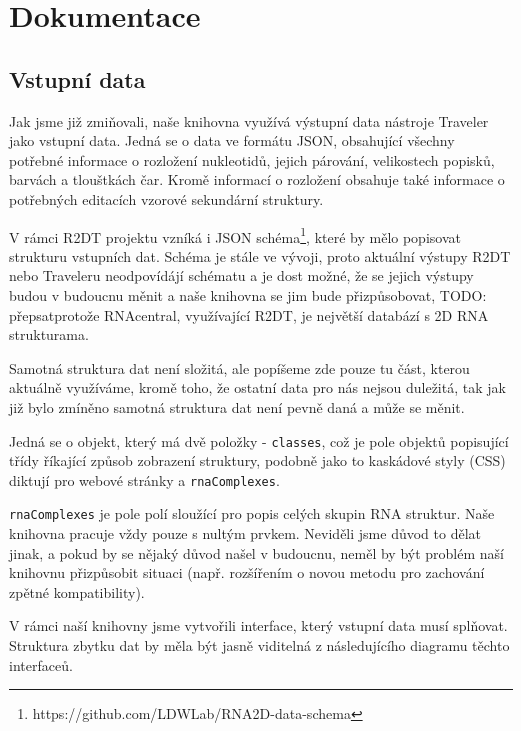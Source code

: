 \chapter{Dokumentace}

\section{Vstupní data}

Jak jsme již zmiňovali, naše knihovna využívá výstupní data nástroje Traveler
jako vstupní data. Jedná se o data ve formátu JSON, obsahující všechny potřebné
informace o rozložení nukleotidů, jejich párování, velikostech popisků, barvách
a tlouštkách čar. Kromě informací o rozložení obsahuje také informace o
potřebných editacích vzorové sekundární struktury.

V rámci R2DT projektu vzníká i JSON
schéma\footnote{https://github.com/LDWLab/RNA2D-data-schema}, které by mělo
popisovat strukturu vstupních dat. Schéma je stále ve vývoji, proto aktuální
výstupy R2DT nebo Traveleru neodpovídájí schématu a je dost možné, že se jejich
výstupy budou v budoucnu měnit a naše knihovna se jim bude přizpůsobovat,
{\color{red}TODO: přepsat}protože RNAcentral, využívající R2DT, je největší databází s
2D RNA strukturama.

Samotná struktura dat není složitá, ale popíšeme zde pouze tu část, kterou
aktuálně využíváme, kromě toho, že ostatní data pro nás nejsou duležitá, tak
jak již bylo zmíněno samotná struktura dat není pevně daná a může se měnit.

Jedná se o objekt, který má dvě položky - \texttt{classes}, což je pole objektů
popisující třídy říkající způsob zobrazení struktury, podobně jako to kaskádové
styly (CSS) diktují pro webové stránky a \texttt{rnaComplexes}. 

\texttt{rnaComplexes} je pole polí sloužící pro popis celých skupin RNA
struktur. Naše knihovna pracuje vždy pouze s nultým prvkem. Neviděli jsme důvod
to dělat jinak, a pokud by se nějaký důvod našel v budoucnu, neměl by být
problém naší knihovnu přizpůsobit situaci (např. rozšířením o novou metodu pro
zachování zpětné kompatibility).

V rámci naší knihovny jsme vytvořili interface, který vstupní data musí
splňovat. Struktura zbytku dat by měla být jasně viditelná z následujícího
diagramu těchto interfaceů.

